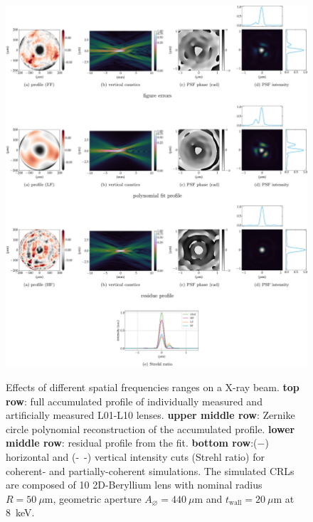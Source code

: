 \begin{refsection}
\begin{figure}[t]
        \centering
        {\includegraphics[width=1\linewidth]{figures/ch05/CDnFF_LF_HH.pdf}}
        \caption[Effects of different spatial frequencies ranges on a X-ray beam]{Effects of different spatial frequencies ranges on a X-ray beam. \textbf{top row}: full accumulated profile of individually measured and artificially measured L01-L10 lenses. \textbf{upper middle row}: Zernike circle polynomial reconstruction of the accumulated profile. \textbf{lower middle row}: residual profile from the fit. \textbf{bottom row}:($-$) horizontal and (-~-) vertical intensity cuts (Strehl ratio) for coherent- and partially-coherent simulations. The simulated CRLs are composed of 10 2D-Beryllium lens with nominal radius $R=50~\mu\text{m}$, geometric aperture $A_{\diameter}=440~\mu\text{m}$ and $t_\text{wall}=20~\mu$m at 8~keV.}\label{fig:CDnFF_LF_HH}
\end{figure}


\end{refsection}
